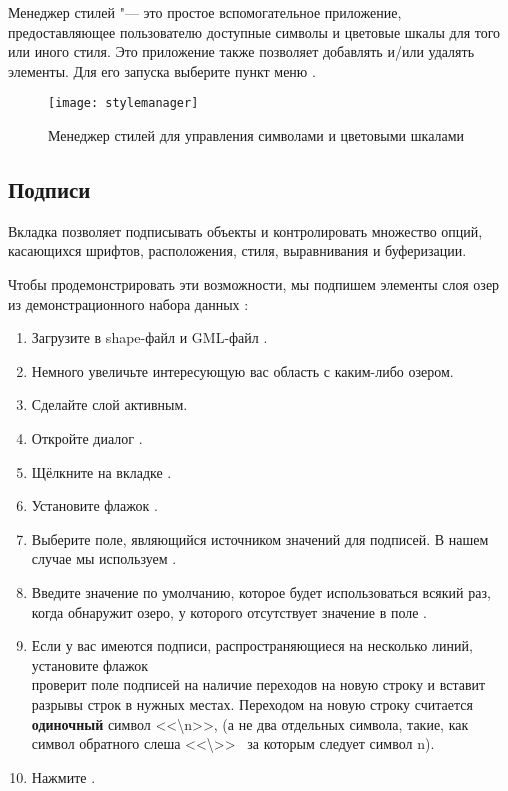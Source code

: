 Менеджер стилей "--- это простое вспомогательное приложение, предоставляющее
пользователю доступные символы и цветовые шкалы для того или иного стиля.
Это приложение также позволяет добавлять и/или удалять элементы. Для его
запуска выберите пункт меню  \arrow
{}.

\begin{figure}[ht]
   \centering
   \texttt{[image: stylemanager]}
   \caption{Менеджер стилей для управления символами и цветовыми шкалами \wincaption}\label{fig:stylemanager}
\end{figure}

\subsection{Подписи}\label{labeltab}

Вкладка  позволяет подписывать объекты и контролировать
множество опций, касающихся шрифтов, расположения, стиля, выравнивания и
буферизации.

Чтобы продемонстрировать эти возможности, мы подпишем элементы слоя озер
из демонстрационного набора данных \qg:

\begin{enumerate}
\item Загрузите в \qg shape-файл  и GML-файл .
\item Немного увеличьте интересующую вас область с каким-либо озером.
\item Сделайте слой  активным.
\item Откройте диалог .
\item Щёлкните на вкладке .
\item Установите флажок .
\item Выберите поле, являющийся источником значений для подписей. В нашем
случае мы используем .
\item Введите значение по умолчанию, которое будет использоваться всякий
раз, когда \qg обнаружит озеро, у которого отсутствует значение в поле
.
\item Если у вас имеются подписи, распространяющиеся на несколько линий,
установите флажок \\
 \qg проверит поле подписей на
наличие переходов на новую строку и вставит разрывы строк в нужных местах.
Переходом на новую строку считается \textbf{одиночный} символ <<\textbackslash n>>,
(а не два отдельных символа, такие, как символ обратного слеша <<\textbackslash >>
~за которым следует символ n).
\item Нажмите .
\end{enumerate}

